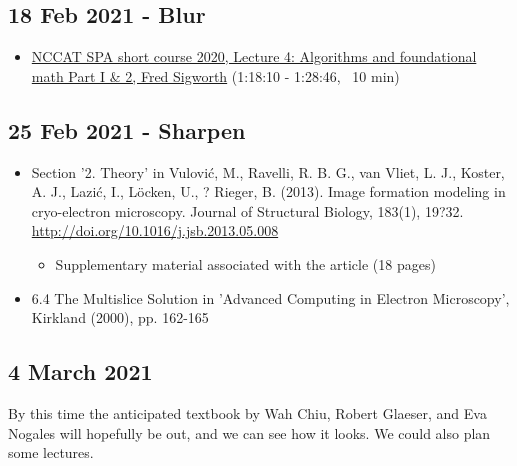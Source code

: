 \documentclass[11pt, oneside]{article}   	%
\begin{document}
\pagebreak
\subsection{18 Feb 2021 - Blur}
\begin{itemize}
	\item \href{https://youtu.be/tzv5c5K7MEk?t=4690}{NCCAT SPA short course 2020, Lecture 4: Algorithms and foundational math Part I \& 2, Fred Sigworth} (1:18:10 - 1:28:46, ~10 min)
	\end{itemize}

\subsection{25 Feb 2021 - Sharpen}
\begin{itemize}
	\item Section '2. Theory' in Vulovi\'{c}, M., Ravelli, R. B. G., van Vliet, L. J., Koster, A. J., Lazi\'{c}, I., L\"ocken, U., ? Rieger, B. (2013). Image formation modeling in cryo-electron microscopy. Journal of Structural Biology, 183(1), 19?32. \url{http://doi.org/10.1016/j.jsb.2013.05.008}
	\begin{itemize}
		\item Supplementary material associated with the article (18 pages)
	\end{itemize}
	\item 6.4 The Multislice Solution in 'Advanced Computing in Electron Microscopy', Kirkland (2000), pp. 162-165
\end{itemize}

\pagebreak
\subsection{4 March 2021}
By this time the anticipated textbook by Wah Chiu, Robert Glaeser, and Eva Nogales will hopefully be out, and we can see how it looks. We could also plan some lectures.
\end{document}
